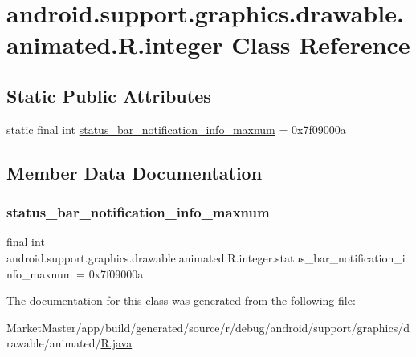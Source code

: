 \hypertarget{classandroid_1_1support_1_1graphics_1_1drawable_1_1animated_1_1R_1_1integer}{}\section{android.\+support.\+graphics.\+drawable.\+animated.\+R.\+integer Class Reference}
\label{classandroid_1_1support_1_1graphics_1_1drawable_1_1animated_1_1R_1_1integer}
\subsection*{Static Public Attributes}
\begin{DoxyCompactItemize}
\item 
static final int \mbox{\hyperlink{classandroid_1_1support_1_1graphics_1_1drawable_1_1animated_1_1R_1_1integer_a60aefdee6a7431a6f35a15a0bb57537b}{status\+\_\+bar\+\_\+notification\+\_\+info\+\_\+maxnum}} = 0x7f09000a
\end{DoxyCompactItemize}


\subsection{Member Data Documentation}
\mbox{\label{classandroid_1_1support_1_1graphics_1_1drawable_1_1animated_1_1R_1_1integer_a60aefdee6a7431a6f35a15a0bb57537b}} 
\subsubsection{\texorpdfstring{status\+\_\+bar\+\_\+notification\+\_\+info\+\_\+maxnum}{status\_bar\_notification\_info\_maxnum}}
{\footnotesize\ttfamily final int android.\+support.\+graphics.\+drawable.\+animated.\+R.\+integer.\+status\+\_\+bar\+\_\+notification\+\_\+info\+\_\+maxnum = 0x7f09000a\hspace{0.3cm}{\ttfamily [static]}}



The documentation for this class was generated from the following file\+:\begin{DoxyCompactItemize}
\item 
Market\+Master/app/build/generated/source/r/debug/android/support/graphics/drawable/animated/\mbox{\hyperlink{debug_2android_2support_2graphics_2drawable_2animated_2R_8java}{R.\+java}}\end{DoxyCompactItemize}
